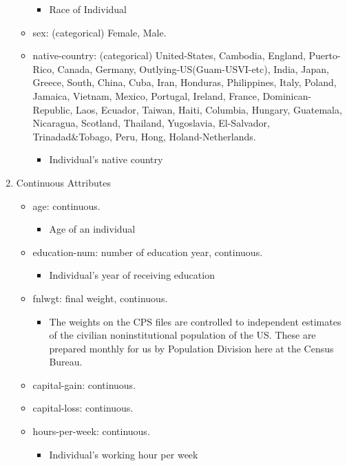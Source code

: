 \documentclass{report}
\providecommand{\tightlist}{%
      \setlength{\itemsep}{0pt}\setlength{\parskip}{0pt}}
\begin{document}
\begin{enumerate}
\begin{itemize}
    \begin{itemize}
    \tightlist
    \item
      Race of Individual
    \end{itemize}
  \item
    sex: (categorical) Female, Male.
  \item
    native-country: (categorical) United-States, Cambodia, England,
    Puerto-Rico, Canada, Germany, Outlying-US(Guam-USVI-etc), India,
    Japan, Greece, South, China, Cuba, Iran, Honduras, Philippines,
    Italy, Poland, Jamaica, Vietnam, Mexico, Portugal, Ireland, France,
    Dominican-Republic, Laos, Ecuador, Taiwan, Haiti, Columbia, Hungary,
    Guatemala, Nicaragua, Scotland, Thailand, Yugoslavia, El-Salvador,
    Trinadad\&Tobago, Peru, Hong, Holand-Netherlands.

    \begin{itemize}
    \tightlist
    \item
      Individual's native country
    \end{itemize}
  \end{itemize}
\item
  Continuous Attributes

  \begin{itemize}
  \tightlist
  \item
    age: continuous.

    \begin{itemize}
    \tightlist
    \item
      Age of an individual
    \end{itemize}
  \item
    education-num: number of education year, continuous.

    \begin{itemize}
    \tightlist
    \item
      Individual's year of receiving education
    \end{itemize}
  \item
    fnlwgt: final weight, continuous.

    \begin{itemize}
    \tightlist
    \item
      The weights on the CPS files are controlled to independent
      estimates of the civilian noninstitutional population of the US.
      These are prepared monthly for us by Population Division here at
      the Census Bureau.
    \end{itemize}
  \item
    capital-gain: continuous.
  \item
    capital-loss: continuous.
  \item
    hours-per-week: continuous.

    \begin{itemize}
    \tightlist
    \item
      Individual's working hour per week
    \end{itemize}
  \end{itemize}
\end{enumerate}
\end{document}
